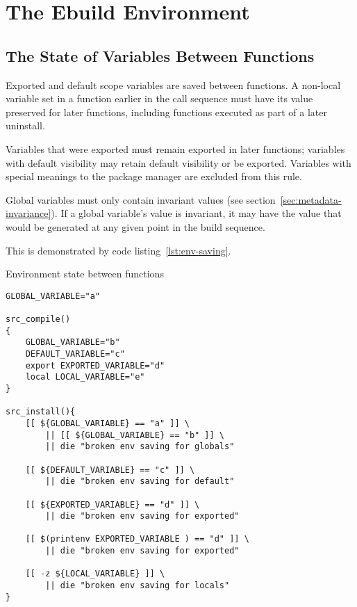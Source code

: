 \chapter{The Ebuild Environment}



\section{The State of Variables Between Functions}
\label{sec:ebuild-env-state}

Exported and default scope variables are saved between functions. A non-local variable set in a
function earlier in the call sequence must have its value preserved for later functions, including
functions executed as part of a later uninstall.


Variables that were exported must remain exported in later functions; variables with default
visibility may retain default visibility or be exported. Variables with special meanings to the
package manager are excluded from this rule.

Global variables must only contain invariant values (see section~\ref{sec:metadata-invariance}).
If a global variable's value is invariant, it may have the value that would be generated at any
given point in the build sequence.

This is demonstrated by code listing~\ref{lst:env-saving}.

\begin{listing}
\caption{Environment state between functions} \label{lst:env-saving}
\begin{verbatim}
GLOBAL_VARIABLE="a"

src_compile()
{
    GLOBAL_VARIABLE="b"
    DEFAULT_VARIABLE="c"
    export EXPORTED_VARIABLE="d"
    local LOCAL_VARIABLE="e"
}

src_install(){
    [[ ${GLOBAL_VARIABLE} == "a" ]] \
        || [[ ${GLOBAL_VARIABLE} == "b" ]] \
        || die "broken env saving for globals"

    [[ ${DEFAULT_VARIABLE} == "c" ]] \
        || die "broken env saving for default"

    [[ ${EXPORTED_VARIABLE} == "d" ]] \
        || die "broken env saving for exported"

    [[ $(printenv EXPORTED_VARIABLE ) == "d" ]] \
        || die "broken env saving for exported"

    [[ -z ${LOCAL_VARIABLE} ]] \
        || die "broken env saving for locals"
}
\end{verbatim}
\end{listing}

